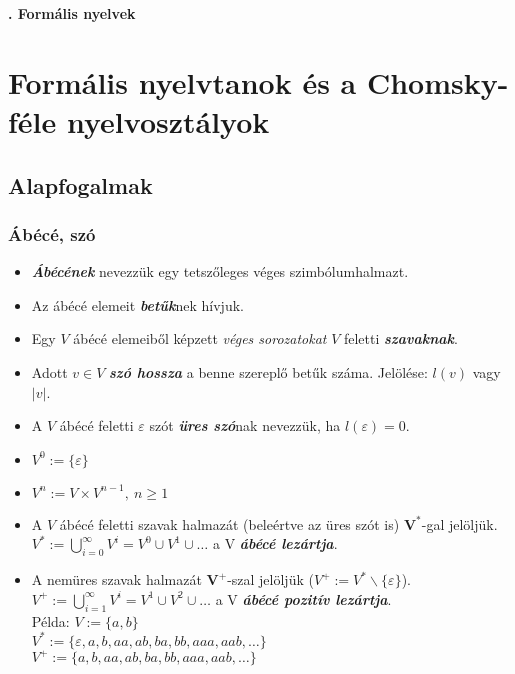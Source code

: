 \documentclass[12pt,margin=0px]{article}
\begin{document}
    \thispagestyle{fancy}
    {\Large\bfseries{}. Formális nyelvek} \\
	
    \section*{Formális nyelvtanok és a Chomsky-féle nyelvosztályok}
	
    {\footnotesize \noindent {\color{blue} \faLightbulbO\ $\triangleright$ } }

    \subsection*{Alapfogalmak\\}
			
    \subsubsection*{Ábécé, szó\\}
	
    \begin{itemize}
    	\item \textbf{\emph{Ábécének}} nevezzük egy tetszőleges véges szimbólumhalmazt.
        \item Az ábécé elemeit \textbf{\emph{betűk}}nek hívjuk.
        \item Egy $V$ ábécé elemeiből képzett \emph{véges sorozatokat} $V$ feletti \textbf{\emph{szavaknak}}.
        \item Adott $v \in V$ \textbf{\emph{szó hossza}} a benne szereplő betűk száma. Jelölése: $l(v)$ vagy $|v|$.
        \item A $V$ ábécé feletti $\varepsilon$ szót \textbf{\emph{üres szó}}nak nevezzük, ha $l(\varepsilon) = 0$.
        \item $V^{0} := \{\varepsilon \}$
        \item $V^{n} := V \times V^{n - 1},\ n \geq 1$
        \item A $V$ ábécé feletti szavak halmazát (beleértve az üres szót is) $\boldsymbol{V^*}$-gal jelöljük.\\
            $V^{*} := \bigcup\limits_{i = 0}^{\infty}V^{i} = V^{0} \cup V^{1} \cup \ldots$ a V \textbf{\emph{ábécé lezártja}}.
        \item A nemüres szavak halmazát $\boldsymbol{V^+}$-szal jelöljük ($V^{+} := V^{*}\backslash\{\varepsilon\}$).\\
            $V^{+} := \bigcup\limits_{i = 1}^{\infty}V^{i} = V^{1} \cup V^{2} \cup \ldots$ a V \textbf{\emph{ábécé pozitív lezártja}}.\\

        Példa: $V:= \{a, b\}$\\
        $V^{*} := \{\varepsilon, a, b, aa, ab, ba, bb, aaa, aab, \ldots\}$\\
        $V^{+} := \{a, b, aa, ab, ba, bb, aaa, aab, \ldots\}$
    \end{itemize}
						
\end{document}
